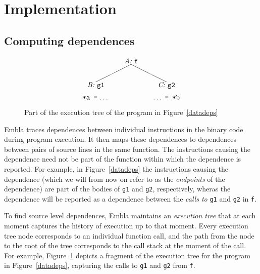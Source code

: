 \section{Implementation}

\subsection{Computing dependences}   \label{snca}

\begin{figure} \small
\hrulefill
\[
\begin{picture}(160,60)(70,15)
\put(120,65){\makebox(60,10)[c]{\it A:\ \tt f}}
\put(150,65){\line(-2,-1){50}}
\put(150,65){\line( 2,-1){50}}
\put(170,30){\makebox(60,10)[c]{\it C:\ \tt g2}}
\put(70,30){\makebox(60,10)[c]{\it B:\ \tt g1}}
\put(70,15){\makebox(60,10)[cb]{{\tt *a\ =}\ \ldots}}
\put(170,15){\makebox(60,10)[cb]{\ldots\ {\tt =\ *b}}}
\end{picture}
\]
\hrulefill
\caption{Part of the execution tree of the program in Figure~\ref{datadeps}
} 
\label{ffextree}
\end{figure}

Embla traces dependences between individual instructions in the binary
code during program execution. It then maps these dependences to 
dependences between pairs of source lines in the same function. The
instructions causing the dependence need not be part of the function 
within which the dependence is reported. For example, in 
Figure~\ref{datadeps} the instructions causing the dependence (which we
will from now on refer to as the {\em endpoints} of the dependence) 
are part of the bodies of {\tt g1} and {\tt g2}, respectively, wheras the dependence 
will be reported as a dependence between the {\em calls to} {\tt g1} and 
{\tt g2} in {\tt f}.

To find source level dependences, Embla maintains an {\em execution tree} 
that at each moment captures 
the history of execution up to that moment. Every execution tree node 
corresponds to an
individual function call, and the path from the node to the root of the
tree corresponds to the call stack at the moment of the call. For
example, Figure~\ref{ffextree} depicts a fragment of the execution tree
for the program in Figure~\ref{datadeps}, capturing the calls to {\tt g1} 
and {\tt g2} from {\tt f}.

